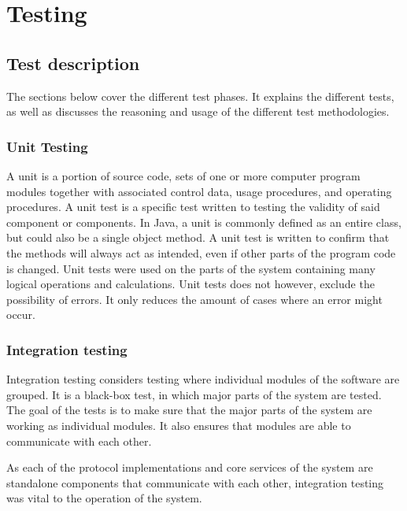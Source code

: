 
\chapter{Testing}
\label{ch:testing}

\section{Test description}
\label{sec:testing-test_description}

The sections below cover the different test phases. It explains the different tests, as well as discusses the reasoning and usage of the different test methodologies.

\subsection{Unit Testing}
\label{subsec:testing-test_description-unit_testing}

A unit is a portion of source code, sets of one or more computer program modules together with associated control data, usage procedures, and operating procedures. A unit test is a specific test written to testing the validity of said component or components. In Java, a unit is commonly defined as an entire class, but could also be a single object method. A unit test is written to confirm that the methods will always act as intended, even if other parts of the program code is changed. Unit tests were used on the parts of the system containing many logical operations and calculations. Unit tests does not however, exclude the possibility of errors. It only reduces the amount of cases where an error might occur.

\subsection{Integration testing}
\label{subsec:testing-test_description-integration_testing}

Integration testing considers testing where individual modules of the software are grouped. It is a black-box test, in which major parts of the system are tested. The goal of the tests is to make sure that the major parts of the system are working as individual modules. It also ensures that modules are able to communicate with each other.

As each of the protocol implementations and core services of the system are standalone components that communicate with each other, integration testing was vital to the operation of the system. 

